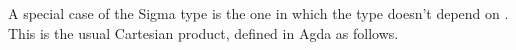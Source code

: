 A special case of the Sigma type is the one in which the type  doesn't depend on . This is the usual Cartesian product, defined in Agda as follows.
\ccpad
\begin{code}%
\>[1]\AgdaSpace{}%
\AgdaSymbol{:}\AgdaSpace{}%
\AgdaSpace{}%
\AgdaSpace{}%
\AgdaSpace{}%
\AgdaSpace{}%
\AgdaSpace{}%
\AgdaSpace{}%
\AgdaSpace{}%
\AgdaSpace{}%
\AgdaSpace{}%
\<%
\\
%
\>[1]\AgdaSpace{}%
\AgdaSpace{}%
\AgdaSpace{}%
\AgdaSymbol{=}\AgdaSpace{}%
\AgdaSpace{}%
\AgdaSpace{}%
\AgdaSpace{}%
\AgdaSpace{}%
\AgdaFunction{,}\AgdaSpace{}%
\<%
\end{code}





